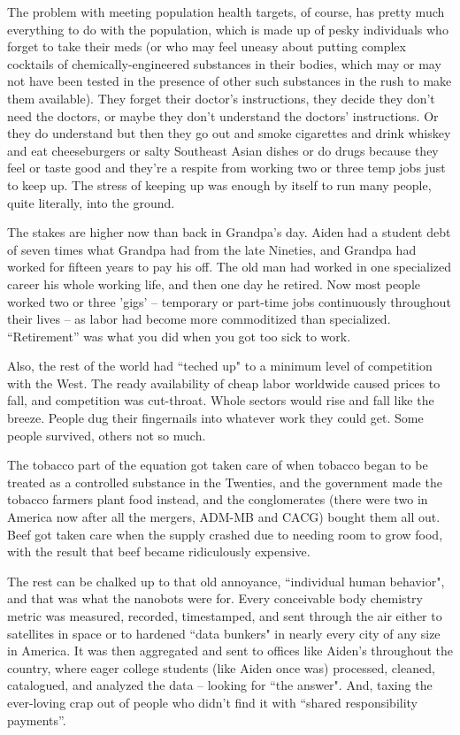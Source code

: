 \documentclass[11pt]{book}
\begin{document}
	The problem with meeting population health targets, of course, has pretty much everything to do with the population, which is made up of pesky individuals who forget to take their meds (or who may feel uneasy about putting complex cocktails of chemically-engineered substances in their bodies, which may or may not have been tested in the presence of other such substances in the rush to make them available). They forget their doctor's instructions, they decide they don't need the doctors, or maybe they don't understand the doctors' instructions. Or they do understand but then they go out and smoke cigarettes and drink whiskey and eat cheeseburgers or salty Southeast Asian dishes or do drugs because they feel or taste good and they're a respite from working two or three temp jobs just to keep up. The stress of keeping up was enough by itself to run many people, quite literally, into the ground.
	
	The stakes are higher now than back in Grandpa's day. Aiden had a student debt of seven times what Grandpa had from the late Nineties, and Grandpa had worked for fifteen years to pay his off. The old man had worked in one specialized career his whole working life, and then one day he retired. Now most people worked two or three 'gigs' -- temporary or part-time jobs continuously throughout their lives -- as labor had become more commoditized than specialized. ``Retirement'' was what you did when you got too sick to work. 
	
	Also, the rest of the world had ``teched up" to a minimum level of competition with the West. The ready availability of cheap labor worldwide caused prices to fall, and competition was cut-throat. Whole sectors would rise and fall like the breeze. People dug their fingernails into whatever work they could get. Some people survived, others not so much.
	
	The tobacco part of the equation got taken care of when tobacco began to be treated as a controlled substance in the Twenties, and the government made the tobacco farmers plant food instead, and the conglomerates (there were two in America now after all the mergers, ADM-MB and CACG) bought them all out. Beef got taken care when the supply crashed due to needing room to grow food, with the result that beef became ridiculously expensive. 
	
	The rest can be chalked up to that old annoyance, ``individual human behavior", and that was what the nanobots were for. Every conceivable body chemistry metric was measured, recorded, timestamped, and sent through the air either to satellites in space or to hardened ``data bunkers" in nearly every city of any size in America. It was then aggregated and sent to offices like Aiden's throughout the country, where eager college students (like Aiden once was) processed, cleaned, catalogued, and analyzed the data -- looking for ``the answer". And, taxing the ever-loving crap out of people who didn't find it with ``shared responsibility payments''.
	
\end{document}
